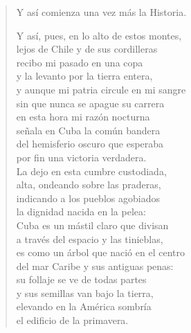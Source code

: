 \documentclass[12pt]{article}
\begin{document}
\begin{verse}
Y así comienza una vez más la Historia.  

Y así, pues, en lo alto de estos montes,\\
lejos de Chile y de sus cordilleras\\
recibo mi pasado en una copa\\
y la levanto por la tierra entera,\\
y aunque mi patria circule en mi sangre\\
sin que nunca se apague su carrera\\
en esta hora mi razón nocturna\\
señala en Cuba la común bandera\\
del hemisferio oscuro que esperaba\\
por fin una victoria verdadera.\\
La dejo en esta cumbre custodiada,\\
alta, ondeando sobre las praderas,\\
indicando a los pueblos agobiados\\
la dignidad nacida en la pelea:\\
Cuba es un mástil claro que divisan\\
a través del espacio y las tinieblas,\\
es como un árbol que nació en el centro\\
del mar Caribe y sus antiguas penas:\\
su follaje se ve de todas partes\\
y sus semillas van bajo la tierra,\\
elevando en la América sombría\\
el edificio de la primavera.  

\end{verse}
\end{document}

